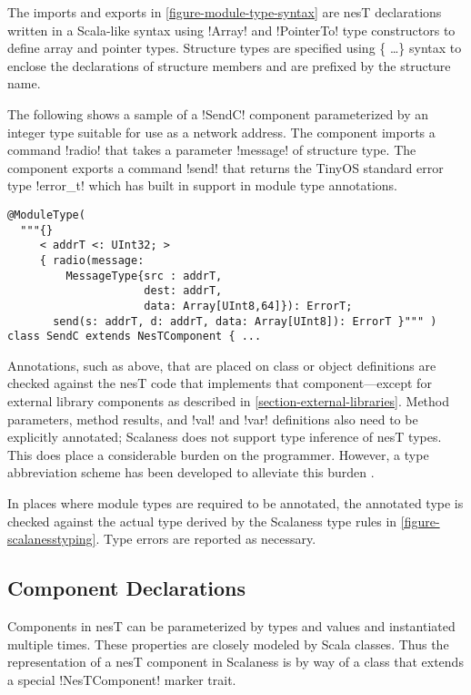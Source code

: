 The imports and exports in \autoref{figure-module-type-syntax} are nesT declarations written in
a Scala-like syntax using !Array! and !PointerTo! type constructors to define array and pointer
types. Structure types are specified using \{ \ldots \} syntax to enclose the declarations of
structure members and are prefixed by the structure name.

The following shows a sample of a !SendC! component parameterized by an integer type suitable
for use as a network address. The component imports a command !radio! that takes a parameter
!message! of structure type. The component exports a command !send! that returns the TinyOS
standard error type !error_t! which has built in support in module type annotations.

\singlespace
\vspace{1.0ex}
\begin{lstlisting}[language=scalaness]
@ModuleType(
  """{}
     < addrT <: UInt32; >
     { radio(message:
         MessageType{src : addrT,
                     dest: addrT,
                     data: Array[UInt8,64]}): ErrorT;
       send(s: addrT, d: addrT, data: Array[UInt8]): ErrorT }""" )
class SendC extends NesTComponent { ...
\end{lstlisting}
\vspace{1.0ex}
\primaryspacing

Annotations, such as above, that are placed on class or object definitions are checked against
the nesT code that implements that component---except for external library components as
described in \autoref{section-external-libraries}. Method parameters, method results, and !val!
and !var! definitions also need to be explicitly annotated; Scalaness does not support type
inference of nesT types. This does place a considerable burden on the programmer. However, a
type abbreviation scheme has been developed to alleviate this burden \cite{watson-masters-2013}.

In places where module types are required to be annotated, the annotated type is checked against
the actual type derived by the Scalaness type rules in \autoref{figure-scalanesstyping}. Type
errors are reported as necessary.

\subsection{Component Declarations}
\label{section-component-declarations}

Components in nesT can be parameterized by types and values and instantiated multiple times.
These properties are closely modeled by Scala classes. Thus the representation of a nesT
component in Scalaness is by way of a class that extends a special !NesTComponent! marker trait.

